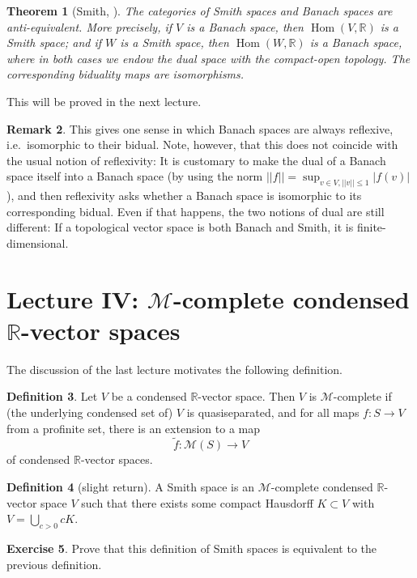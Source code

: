 \documentclass[11pt]{amsbook}
\DeclareMathOperator{\Hom}{Hom}
\renewcommand*{\tilde}{\widetilde}
\numberwithin{equation}{section}
\newtheorem{theorem}{Theorem}
\numberwithin{theorem}{section}
\theoremstyle{definition}
\newtheorem{remark}[theorem]{Remark}
\newtheorem{exercise}[theorem]{Exercise}
\newtheorem{definition}[theorem]{Definition}
\begin{document}
\begin{theorem}[Smith, \cite{Smith}] The categories of Smith spaces and Banach spaces are anti-equivalent. More precisely, if $V$ is a Banach space, then $\Hom(V,\mathbb R)$ is a Smith space; and if $W$ is a Smith space, then $\Hom(W,\mathbb R)$ is a Banach space, where in both cases we endow the dual space with the compact-open topology. The corresponding biduality maps are isomorphisms.
\end{theorem}

This will be proved in the next lecture.

\begin{remark} This gives one sense in which Banach spaces are always reflexive, i.e.~isomorphic to their bidual. Note, however, that this does not coincide with the usual notion of reflexivity: It is customary to make the dual of a Banach space itself into a Banach space (by using the norm $||f||=\sup_{v\in V, ||v||\leq 1} |f(v)|$), and then reflexivity asks whether a Banach space is isomorphic to its corresponding bidual. Even if that happens, the two notions of dual are still different: If a topological vector space is both Banach and Smith, it is finite-dimensional.
\end{remark}

\newpage

\section{Lecture IV: $\mathcal M$-complete condensed $\mathbb R$-vector spaces}

The discussion of the last lecture motivates the following definition.

\begin{definition} Let $V$ be a condensed $\mathbb R$-vector space. Then $V$ is $\mathcal M$-complete if (the underlying condensed set of) $V$ is quasiseparated, and for all maps $f: S\to V$ from a profinite set, there is an extension to a map
\[
\tilde{f}: \mathcal M(S)\to V
\]
of condensed $\mathbb R$-vector spaces.
\end{definition}

\begin{definition}[slight return] A Smith space is an $\mathcal M$-complete condensed $\mathbb R$-vector space $V$ such that there exists some compact Hausdorff $K\subset V$ with $V=\bigcup_{c>0} cK$.
\end{definition}

\begin{exercise} Prove that this definition of Smith spaces is equivalent to the previous definition.
\end{exercise}
\end{document}
